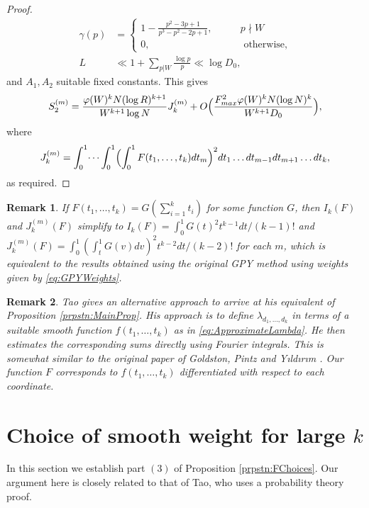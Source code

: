 \documentclass[12pt,a4paper]{amsart}
\theoremstyle{plain}
\newtheorem*{rmk}{Remark}
\numberwithin{sblmm}{thrm}
\numberwithin{equation}{section}
\renewcommand{\phi}{\varphi}
\begin{document}
\begin{proof}
\begin{align}
\gamma(p)&=\begin{cases}1-\frac{p^2-3p+1}{p^3-p^2-2p+1},\qquad&p\nmid W\\ 0,&\text{ otherwise,}\end{cases}\\
L&\ll 1+\sum_{p|W}\frac{\log{p}}{p}\ll \log{D_0},
\end{align}
and $A_1,A_2$ suitable fixed constants. This gives
\begin{equation}
S_2^{(m)}=\frac{\phi(W)^{k} N (\log{R})^{k+1}}{W^{k+1}\log{N}}J^{(m)}_k+O\Bigl(\frac{F_{max}^2 \phi(W)^k N (\log{N})^k}{W^{k+1}D_0}\Bigr),
\end{equation}
where
\begin{equation}
J^{(m)}_k=\int_0^1\dotsi\int_0^1\Bigl(\int_0^1 F(t_1,\dotsc,t_k)dt_m\Bigr)^2dt_1\dotsc dt_{m-1}dt_{m+1}\dotsc dt_k,
\end{equation}
as required.
\end{proof}
\begin{rmk}If $F(t_1,\dotsc,t_k)=G(\sum_{i=1}^kt_i)$ for some function $G$, then $I_k(F)$ and $J_k^{(m)}(F)$ simplify to $I_k(F)=\int_0^1G(t)^2t^{k-1}dt/(k-1)!$ and $J_k^{(m)}(F)=\int_0^1 (\int_t^1G(v)dv)^2 t^{k-2}dt/(k-2)!$ for each $m$, which is equivalent to the results obtained using the original GPY method using weights given by \eqref{eq:GPYWeights}.
\end{rmk}
\begin{rmk}
Tao gives an alternative approach to arrive at his equivalent of Proposition \ref{prpstn:MainProp}. His approach is to define $\lambda_{d_1,\dots,d_k}$ in terms of a suitable smooth function $f(t_1,\dotsc,t_k)$ as in \eqref{eq:ApproximateLambda}. He then estimates the corresponding sums directly using Fourier integrals. This is somewhat similar to the original paper of Goldston, Pintz and Y\i ld\i r\i m \cite{GPY}. Our function $F$ corresponds to $f(t_1,\dotsc,t_k)$ differentiated with respect to each coordinate.
\end{rmk}
\section{\texorpdfstring{Choice of smooth weight for large $k$}{Choice of smooth weight for large k}}
In this section we establish part $(3)$ of Proposition \ref{prpstn:FChoices}. Our argument here is closely related to that of Tao, who uses a probability theory proof.
\end{document}
